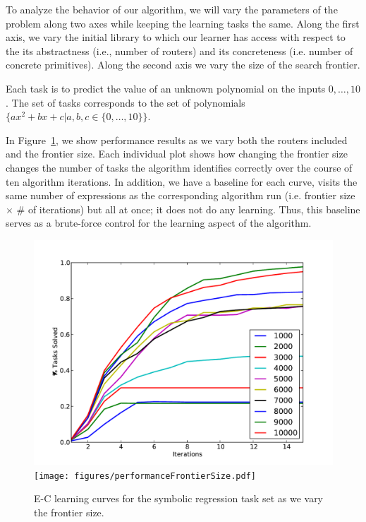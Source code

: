 \documentclass{article}
\begin{document}
To analyze the behavior of our algorithm, we will vary the parameters
of the problem along two axes while keeping the learning tasks the
same. Along the first axis, we vary the initial library to which our
learner has access with respect to the its abstractness (i.e., number
of routers) and its concreteness (i.e. number of concrete
primitives). Along the second axis we vary the size of the search
frontier.

Each task is to predict the value of an unknown polynomial on the
inputs $0, \dots, 10$. The set of tasks corresponds to the set of
polynomials $\{ax^2 + bx + c | a, b, c \in \{0, \dots, 10 \}\}$. 

In Figure~\ref{fig:symreg}, we show performance results as we vary
both the routers included and the frontier size. Each individual plot
shows how changing the frontier size changes the number of tasks the
algorithm identifies correctly over the course of ten algorithm
iterations. In addition, we have a baseline for each curve, visits the
same number of expressions as the corresponding algorithm run
(i.e. frontier size $\times$ $\#$ of iterations) but all at once; it
does not do any learning. Thus, this baseline serves as a brute-force
control for the learning aspect of the algorithm. 

\begin{figure}
\label{fig:symreg}
\includegraphics[width=\linewidth]{figures/learningCurves.pdf}
\texttt{[image: figures/performanceFrontierSize.pdf]}
\caption{E-C learning curves for the symbolic regression task set as
  we vary the frontier size.}
\end{figure}
\end{document}
